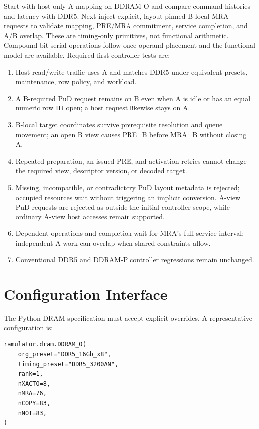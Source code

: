\documentclass[9pt,twocolumn]{extarticle}
\begin{document}
Start with host-only A mapping on DDRAM-O and compare command histories and
latency with DDR5. Next inject explicit, layout-pinned B-local MRA requests
to validate mapping, PRE/MRA commitment, service completion, and A/B overlap.
These are timing-only primitives, not functional arithmetic. Compound
bit-serial operations follow once operand placement and the functional model
are available. Required first controller tests are:
\begin{enumerate}
  \item Host read/write traffic uses A and matches DDR5 under equivalent
        presets, maintenance, row policy, and workload.
  \item A B-required PuD request remains on B even when A is idle or has an
        equal numeric row ID open; a host request likewise stays on A.
  \item B-local target coordinates survive prerequisite resolution and queue
        movement; an open B view causes PRE\_B before MRA\_B without closing A.
  \item Repeated preparation, an issued PRE, and activation retries cannot
        change the required view, descriptor version, or decoded target.
  \item Missing, incompatible, or contradictory PuD layout metadata is rejected;
        occupied resources wait without triggering an implicit conversion.
        A-view PuD requests are rejected as outside the initial controller
        scope, while ordinary A-view host accesses remain supported.
  \item Dependent operations and completion wait for MRA's full service
        interval; independent A work can overlap when shared constraints allow.
  \item Conventional DDR5 and DDRAM-P controller regressions remain unchanged.
\end{enumerate}

\section{Configuration Interface}

The Python DRAM specification must accept explicit overrides. A representative
configuration is:

\begin{small}
\begin{verbatim}
ramulator.dram.DDRAM_O(
    org_preset="DDR5_16Gb_x8",
    timing_preset="DDR5_3200AN",
    rank=1,
    nXACTO=8,
    nMRA=76,
    nCOPY=83,
    nNOT=83,
)
\end{verbatim}
\end{small}
\end{document}
